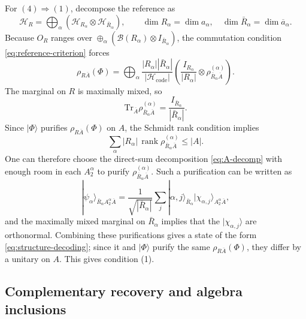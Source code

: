\documentclass[11pt]{article}
\newcommand{\mH}{\mathcal{H}}
\newcommand{\mB}{\mathcal{B}}
\newcommand{\Tr}{\mathrm{Tr}}
\newcommand{\barA}{\overline{A}}
\newcommand{\bara}{\overline{a}}
\newcommand{\ket}[1]{|#1\rangle}
\newcommand{\code}{\mathrm{code}}
\begin{document}
For \((4)\Rightarrow(1)\), decompose the reference as
\[
    \mH_R
    =
    \bigoplus_\alpha
    \left(
    \mH_{R_\alpha}\otimes\mH_{\bar R_\alpha}
    \right),
    \qquad
    \dim R_\alpha=\dim a_\alpha,\quad
    \dim \bar R_\alpha=\dim \bara_\alpha .
\]
Because \(O_R\) ranges over
\(\oplus_\alpha(\mB(R_\alpha)\otimes I_{\bar R_\alpha})\), the commutation
condition \eqref{eq:reference-criterion} forces
\begin{equation}
    \rho_{R\barA}(\Phi)
    =
    \bigoplus_\alpha
    \frac{|R_\alpha||\bar R_\alpha|}{|\mH_{\code}|}
    \left(
    \frac{I_{R_\alpha}}{|R_\alpha|}
    \otimes
    \rho_{\bar R_\alpha\barA}^{(\alpha)}
    \right).
    \label{eq:rho-block-form}
\end{equation}
The marginal on \(R\) is maximally mixed, so
\[
    \Tr_{\barA}\rho_{\bar R_\alpha\barA}^{(\alpha)}
    =
    \frac{I_{\bar R_\alpha}}{|\bar R_\alpha|}.
\]
Since \(\ket{\Phi}\) purifies \(\rho_{R\barA}(\Phi)\) on \(A\), the Schmidt
rank condition implies
\[
    \sum_\alpha
    |R_\alpha|\,
    \operatorname{rank}\rho_{\bar R_\alpha\barA}^{(\alpha)}
    \le
    |A|.
\]
One can therefore choose the direct-sum decomposition
\eqref{eq:A-decomp} with enough room in each \(A_2^\alpha\) to purify
\(\rho_{\bar R_\alpha\barA}^{(\alpha)}\).  Such a purification can be written
as
\[
    \ket{\psi_\alpha}_{\bar R_\alpha A_2^\alpha\barA}
    =
    \frac{1}{\sqrt{|\bar R_\alpha|}}
    \sum_j
    \ket{\alpha,j}_{\bar R_\alpha}
    \ket{\chi_{\alpha,j}}_{A_2^\alpha\barA},
\]
and the maximally mixed marginal on \(\bar R_\alpha\) implies that the
\(\ket{\chi_{\alpha,j}}\) are orthonormal.  Combining these purifications gives
a state of the form \eqref{eq:structure-decoding}; since it and
\(\ket{\Phi}\) purify the same \(\rho_{R\barA}(\Phi)\), they differ by a
unitary on \(A\).  This gives condition (1).

\subsection*{Complementary recovery and algebra inclusions}
\end{document}
